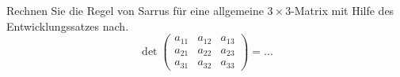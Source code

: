 \begin{ExerciseBlock}
Rechnen Sie die Regel von Sarrus für eine allgemeine $3 \times 3$-Matrix mit Hilfe des Entwicklungssatzes nach.
\begin{equation}
\det 
 \begin{pmatrix}
	a_{11} & a_{12} & a_{13} \\
   	a_{21} & a_{22} & a_{23} \\
   	a_{31} & a_{32} & a_{33}  
 \end{pmatrix}
 = ...
\end{equation}

\end{ExerciseBlock}
